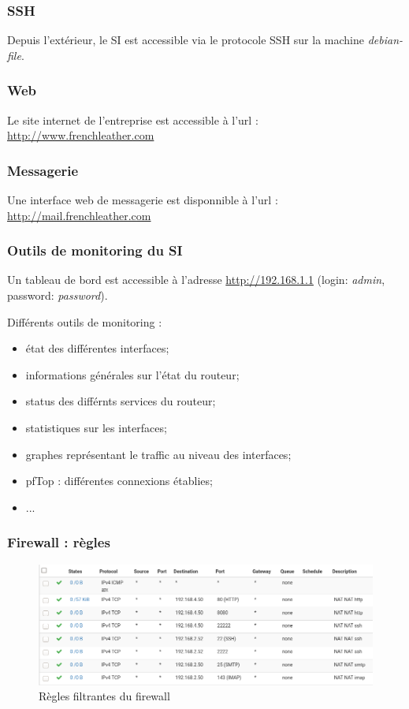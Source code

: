 \documentclass{beamer}
\begin{document}
		\begin{frame}
			\frametitle{SSH}
			Depuis l'extérieur, le SI est accessible via le protocole SSH sur la machine \textit{debian-file}.
		\end{frame}
		\begin{frame}
			\frametitle{Web}
			Le site internet de l'entreprise est accessible à l'url : \url{http://www.frenchleather.com}
		\end{frame}
		\begin{frame}
			\frametitle{Messagerie}
			Une interface web de messagerie est disponnible à l'url : \url{http://mail.frenchleather.com}
		\end{frame}
		\begin{frame}
			\frametitle{Outils de monitoring du SI}
			Un tableau de bord est accessible à l'adresse \url{http://192.168.1.1} (login: \textit{admin}, password: \textit{password}).

			Différents outils de monitoring :
			\begin{itemize}
				\item état des différentes interfaces;
				\item informations générales sur l'état du routeur;
				\item status des différnts services du routeur;
				\item statistiques sur les interfaces;
				\item graphes représentant le traffic au niveau des interfaces;
				\item pfTop : différentes connexions établies;
				\item ...
			\end{itemize}
		\end{frame}
		\begin{frame}
			\frametitle{Firewall : règles}
			\begin{center}
				\begin{figure}
					\includegraphics[scale=.3]{rule.png}
					\caption{Règles filtrantes du firewall}
				\end{figure}
			\end{center}
		\end{frame}
\end{document}
